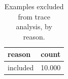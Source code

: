 \begin{table}[htbp]
\caption{Examples excluded from trace analysis, by reason.}
\label{tab:task2_exclusions}
\begin{tabular}{lr}
\toprule
reason & count \\
\midrule
included & 10.000 \\
\bottomrule
\end{tabular}
\end{table}
